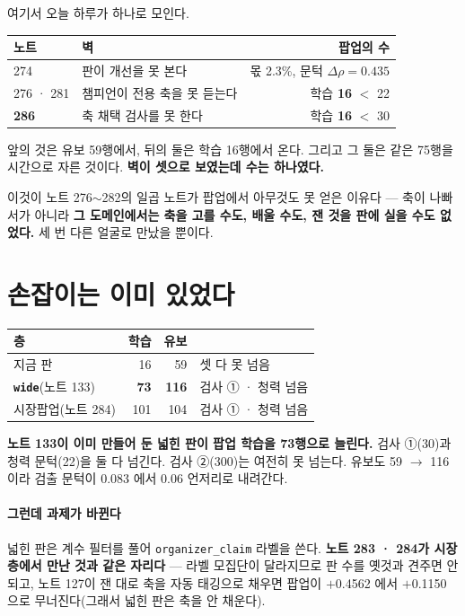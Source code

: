 \documentclass[10pt]{article}
\begin{document}
여기서 오늘 하루가 하나로 모인다.

\begin{center}\small
\begin{tabular}{llr}
\hline
노트 & 벽 & 팝업의 수 \\
\hline
274 & 판이 개선을 못 본다 & 몫 2.3\%, 문턱 $\Delta\rho{=}0.435$ \\
276 · 281 & 챔피언이 전용 축을 못 듣는다 & 학습 \textbf{16} $<$ 22 \\
\textbf{286} & 축 채택 검사를 못 한다 & 학습 \textbf{16} $<$ 30 \\
\hline
\end{tabular}
\end{center}

앞의 것은 유보 59행에서, 뒤의 둘은 학습 16행에서 온다. 그리고 그 둘은 같은
75행을 시간으로 자른 것이다. \textbf{벽이 셋으로 보였는데 수는 하나였다.}

이것이 노트 276$\sim$282의 일곱 노트가 팝업에서 아무것도 못 얻은 이유다 ---
축이 나빠서가 아니라 \textbf{그 도메인에서는 축을 고를 수도, 배울 수도, 잰
것을 판에 실을 수도 없었다.} 세 번 다른 얼굴로 만났을 뿐이다.

\section{손잡이는 이미 있었다}

\begin{center}\small
\begin{tabular}{lrrl}
\hline
층 & 학습 & 유보 & \\
\hline
지금 판 & 16 & 59 & 셋 다 못 넘음 \\
\textbf{\texttt{wide}}(노트 133) & \textbf{73} & \textbf{116} & 검사 ① · 청력 넘음 \\
시장팝업(노트 284) & 101 & 104 & 검사 ① · 청력 넘음 \\
\hline
\end{tabular}
\end{center}

\textbf{노트 133이 이미 만들어 둔 넓힌 판이 팝업 학습을 73행으로 늘린다.}
검사 ①(30)과 청력 문턱(22)을 둘 다 넘긴다. 검사 ②(300)는 여전히 못 넘는다.
유보도 59 $\to$ 116 이라 검출 문턱이 0.083 에서 0.06 언저리로 내려간다.

\paragraph{그런데 과제가 바뀐다} 넓힌 판은 계수 필터를 풀어
\texttt{organizer\_claim} 라벨을 쓴다. \textbf{노트 283 · 284가 시장 층에서
만난 것과 같은 자리다} --- 라벨 모집단이 달라지므로 판 수를 옛것과 견주면
안 되고, 노트 127이 잰 대로 축을 자동 태깅으로 채우면 팝업이 $+$0.4562 에서
$+$0.1150 으로 무너진다(그래서 넓힌 판은 축을 안 채운다).
\end{document}
